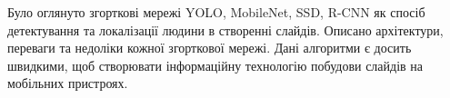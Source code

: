 \chapterConclusion

Було оглянуто згорткові мережі YOLO, MobileNet, SSD, R-CNN
як спосіб детектування та локалізації людини в створенні
слайдів. Описано архітектури, переваги та недоліки кожної 
згорткової мережі. Дані алгоритми є досить швидкими, щоб 
створювати інформаційну технологію побудови слайдів на 
мобільних пристроях.